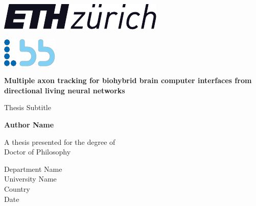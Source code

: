 \begin{titlepage}
    \begin{center}


    \begin{minipage}{0.38\textwidth}
        \includegraphics{ETH_logo.pdf}
        
    \end{minipage}%
    \hfill
    \begin{minipage}{0.7\textwidth}
        \includegraphics{LBB_logo.pdf}
        
    \end{minipage}%


        
        \Huge
        \textbf{Multiple axon tracking for biohybrid brain computer interfaces
        from directional living neural networks}
        
        \vspace{0.5cm}
        \LARGE
        Thesis Subtitle
        
        \vspace{1.5cm}
        
        \textbf{Author Name}
        
        \vfill
        
        A thesis presented for the degree of\\
        Doctor of Philosophy
        
        \vspace{0.8cm}
        
        \Large
        Department Name\\
        University Name\\
        Country\\
        Date
        
    \end{center}




\end{titlepage}